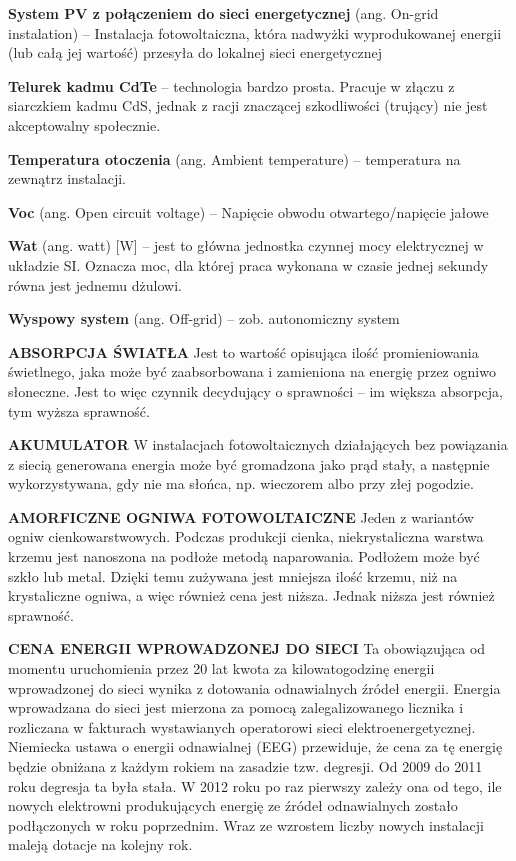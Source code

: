 \documentclass[12pt,a4paper]{article}
\begin{document}
\textbf{System PV z połączeniem do sieci energetycznej} (ang. On-grid instalation)  – Instalacja fotowoltaiczna, która nadwyżki wyprodukowanej energii (lub całą jej wartość) przesyła do lokalnej sieci energetycznej


\textbf{Telurek kadmu CdTe} – technologia bardzo prosta. Pracuje w złączu z siarczkiem kadmu CdS, jednak z racji znaczącej szkodliwości (trujący) nie jest akceptowalny społecznie.

\textbf{Temperatura otoczenia} (ang. Ambient temperature) – temperatura na zewnątrz instalacji.

\textbf{Voc} (ang. Open circuit voltage) – Napięcie obwodu otwartego/napięcie jałowe

\textbf{Wat} (ang. watt) [W] – jest to główna jednostka czynnej mocy elektrycznej w układzie SI. Oznacza moc, dla której praca wykonana w czasie jednej sekundy równa jest jednemu dżulowi.

\textbf{Wyspowy system} (ang. Off-grid) – zob. autonomiczny system


\textbf{ABSORPCJA ŚWIATŁA}
Jest to wartość opisująca ilość promieniowania świetlnego, jaka może być zaabsorbowana i zamieniona na energię przez ogniwo słoneczne. Jest to więc czynnik decydujący o sprawności – im większa absorpcja, tym wyższa sprawność.

\textbf{AKUMULATOR}
W instalacjach fotowoltaicznych działających bez powiązania z siecią generowana energia może być gromadzona jako prąd stały, a następnie wykorzystywana, gdy nie ma słońca, np. wieczorem albo przy złej pogodzie.


\textbf{AMORFICZNE OGNIWA FOTOWOLTAICZNE}
Jeden z wariantów ogniw cienkowarstwowych. Podczas produkcji cienka, niekrystaliczna warstwa krzemu jest nanoszona na podłoże metodą naparowania. Podłożem może być szkło lub metal. Dzięki temu zużywana jest mniejsza ilość krzemu, niż na krystaliczne ogniwa, a więc również cena jest niższa. Jednak niższa jest również sprawność.


\textbf{CENA ENERGII WPROWADZONEJ DO SIECI}
Ta obowiązująca od momentu uruchomienia przez 20 lat kwota za kilowatogodzinę energii wprowadzonej do sieci wynika z dotowania odnawialnych źródeł energii. Energia wprowadzana do sieci jest mierzona za pomocą zalegalizowanego licznika i rozliczana w fakturach wystawianych operatorowi sieci elektroenergetycznej. Niemiecka ustawa o energii odnawialnej (EEG) przewiduje, że cena za tę energię będzie obniżana z każdym rokiem na zasadzie tzw. degresji. Od 2009 do 2011 roku degresja ta była stała. W 2012 roku po raz pierwszy zależy ona od tego, ile nowych elektrowni produkujących energię ze źródeł odnawialnych zostało podłączonych w roku poprzednim. Wraz ze wzrostem liczby nowych instalacji maleją dotacje na kolejny rok.
\end{document}
